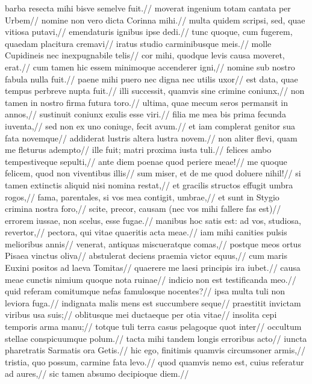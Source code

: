      barba resecta mihi bisve semelve fuit.//
moverat ingenium totam cantata per Urbem//
     nomine non vero dicta Corinna mihi.//
multa quidem scripsi, sed, quae vitiosa putavi,//
     emendaturis ignibus ipse dedi.//
tunc quoque, cum fugerem, quaedam placitura cremavi//
     iratus studio carminibusque meis.//
molle Cupidineis nec inexpugnabile telis//
     cor mihi, quodque levis causa moveret, erat.//
cum tamen hic essem minimoque accenderer igni,//
     nomine sub nostro fabula nulla fuit.//
paene mihi puero nec digna nec utilis uxor//
     est data, quae tempus perbreve nupta fuit.//
illi successit, quamvis sine crimine coniunx,//
     non tamen in nostro firma futura toro.//
ultima, quae mecum seros permansit in annos,//
     sustinuit coniunx exulis esse viri.//
filia me mea bis prima fecunda iuventa,//
     sed non ex uno coniuge, fecit avum.//
et iam complerat genitor sua fata novemque//
     addiderat lustris altera lustra novem.//
non aliter flevi, quam me fleturus adempto//
     ille fuit; matri proxima iusta tuli.//
felices ambo tempestiveque sepulti,//
     ante diem poenae quod periere meae!//
me quoque felicem, quod non viventibus illis//
     sum miser, et de me quod doluere nihil!//
si tamen extinctis aliquid nisi nomina restat,//
     et gracilis structos effugit umbra rogos,//
fama, parentales, si vos mea contigit, umbrae,//
     et sunt in Stygio crimina nostra foro,//
scite, precor, causam (nec vos mihi fallere fas est)//
     errorem iussae, non scelus, esse fugae.//
manibus hoc satis est: ad vos, studiosa, revertor,//
     pectora, qui vitae quaeritis acta meae.//
iam mihi canities pulsis melioribus annis//
     venerat, antiquas miscueratque comas,//
postque meos ortus Pisaea vinctus oliva//
     abstulerat deciens praemia victor equus,//
cum maris Euxini positos ad laeva Tomitas//
     quaerere me laesi principis ira iubet.//
causa meae cunctis nimium quoque nota ruinae//
     indicio non est testificanda meo.//
quid referam comitumque nefas famulosque nocentes?//
     ipsa multa tuli non leviora fuga.//
indignata malis mens est succumbere seque//
     praestitit invictam viribus usa suis;//
oblitusque mei ductaeque per otia vitae//
     insolita cepi temporis arma manu;//
totque tuli terra casus pelagoque quot inter//
     occultum stellae conspicuumque polum.//
tacta mihi tandem longis erroribus acto//
     iuncta pharetratis Sarmatis ora Getis.//
hic ego, finitimis quamvis circumsoner armis,//
     tristia, quo possum, carmine fata levo.//
quod quamvis nemo est, cuius referatur ad aures,//
     sic tamen absumo decipioque diem.//
